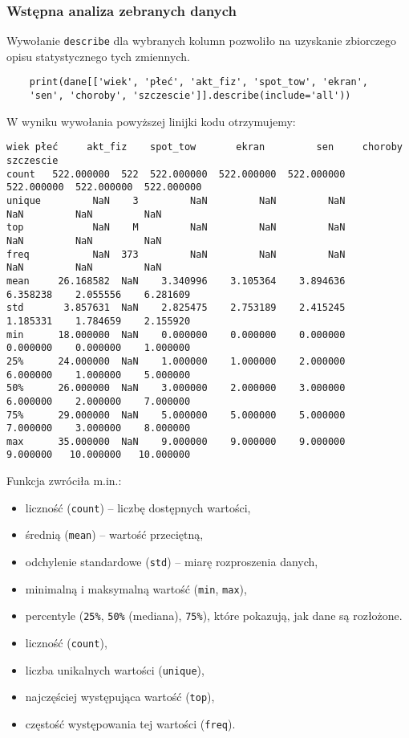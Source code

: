 \documentclass[12pt,a4paper]{article}
\begin{document}
\subsubsection{Wstępna analiza zebranych danych}

Wywołanie \texttt{describe} dla wybranych kolumn pozwoliło na uzyskanie zbiorczego opisu statystycznego tych zmiennych. 
\begin{lstlisting}
    print(dane[['wiek', 'płeć', 'akt_fiz', 'spot_tow', 'ekran', 
    'sen', 'choroby', 'szczescie']].describe(include='all'))
\end{lstlisting}
W wyniku wywołania powyższej linijki kodu otrzymujemy:
\begin{lstlisting}[basicstyle=\ttfamily\fontsize{7}{8}\selectfont\color{black},
  keywordstyle=\color{black},
  commentstyle=\color{black},
  stringstyle=\color{black},
  frame=single]
              wiek płeć     akt_fiz    spot_tow       ekran         sen     choroby   szczescie
count   522.000000  522  522.000000  522.000000  522.000000  522.000000  522.000000  522.000000
unique         NaN    3         NaN         NaN         NaN         NaN         NaN         NaN
top            NaN    M         NaN         NaN         NaN         NaN         NaN         NaN
freq           NaN  373         NaN         NaN         NaN         NaN         NaN         NaN
mean     26.168582  NaN    3.340996    3.105364    3.894636    6.358238    2.055556    6.281609
std       3.857631  NaN    2.825475    2.753189    2.415245    1.185331    1.784659    2.155920
min      18.000000  NaN    0.000000    0.000000    0.000000    0.000000    0.000000    1.000000
25%      24.000000  NaN    1.000000    1.000000    2.000000    6.000000    1.000000    5.000000
50%      26.000000  NaN    3.000000    2.000000    3.000000    6.000000    2.000000    7.000000
75%      29.000000  NaN    5.000000    5.000000    5.000000    7.000000    3.000000    8.000000
max      35.000000  NaN    9.000000    9.000000    9.000000    9.000000   10.000000   10.000000
\end{lstlisting}

Funkcja zwróciła m.in.:
\begin{itemize}
    \item liczność (\texttt{count}) – liczbę dostępnych wartości,
    \item średnią (\texttt{mean}) – wartość przeciętną,
    \item odchylenie standardowe (\texttt{std}) – miarę rozproszenia danych,
    \item minimalną i maksymalną wartość (\texttt{min}, \texttt{max}),
    \item percentyle (\texttt{25\%}, \texttt{50\%} (mediana), \texttt{75\%}), które pokazują, jak dane są rozłożone.
    \item liczność (\texttt{count}),
    \item liczba unikalnych wartości (\texttt{unique}),
    \item najczęściej występująca wartość (\texttt{top}),
    \item częstość występowania tej wartości (\texttt{freq}).
\end{itemize}
\end{document}
